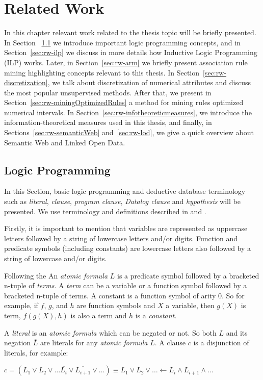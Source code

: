 \chapter{Related Work}
\label{sec:rw-intro}

In this chapter relevant work related to the thesis topic will be briefly presented. In Section 
~\ref{sec:rw-lp} we introduce important logic programming concepts, and in Section~\ref{sec:rw-ilp} we discuss in
more details how Inductive Logic Programming (ILP) works. Later, in Section~\ref{sec:rw-arm} we briefly present
association rule mining highlighting concepts relevant to this thesis. In Section~\ref{sec:rw-discretization}, we
talk about discretization of numerical attributes and discuss the most popular unsupervised methods. After that, we
present in Section~\ref{sec:rw-miningOptimizedRules} a method for mining rules optimized numerical intervals. In
Section~\ref{sec:rw-infotheoreticmeasures}, we introduce the information-theoretical measures used in this thesis,
and finally, in Sections~\ref{sec:rw-semanticWeb} and~\ref{sec:rw-lod}, we give a quick overview about Semantic Web
and Linked Open Data.


\section{Logic Programming}
\label{sec:rw-lp}

In this Section, basic logic programming and deductive database terminology such as \emph{literal}, \emph{clause},
\emph{program clause}, \emph{Datalog clause} and \emph{hypothesis} will be presented. We use terminology and
definitions described in \citet{DBLP:books/sp/Lloyd87} and \citet{LavracDz94}.

Firstly, it is important to
mention that variables are represented as uppercase letters followed by a string of lowercase letters and/or digits.
Function and predicate symbols (including constants) are lowercase letters also followed by a string of lowercase and/or
digits.

Following the An \emph{atomic formula} $L$ is a predicate symbol followed by a bracketed n-tuple of \emph{terms}. A
\emph{term} can
be
a variable or a function symbol followed by a bracketed n-tuple of terms. A constant is a function symbol of arity 0.
So
for example, if $f$, $g$, and $h$ are function symbols and $X$ a variable, then $g(X)$ is term, $f(g(X),h)$ is also a
term and $h$ is a \emph{constant}.

A \emph{literal} is an \emph{atomic formula} which can be negated or not. So both $L$ and its negation $\overline{L}$
are literals for any \emph{atomic formula} $L$. A clause $c$ is a disjunction of literals, for example:
\begin{center}
  $c=(L_1 \vee L_2 \vee \ldots \overline{L_{i}} \vee \overline{L_{i+1}} \vee \ldots) \equiv
 L_1 \vee L_2 \vee \ldots \leftarrow L_i \wedge L_{i+1} \wedge \ldots$
\end{center}

